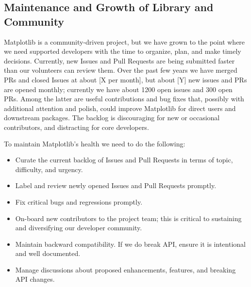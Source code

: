 \documentclass[11pt]{article}  %
\begin{document}
\subsection{Maintenance and Growth of Library and Community}


Matplotlib is a community-driven project, but we have grown to the point
where we need supported developers with the time to organize, plan, and
make timely decisions.  Currently, new Issues and Pull Requests are
being submitted faster than our volunteers can review them.  Over the
past few years we have merged PRs and closed Issues at about [X per
  month], but about [Y] new issues and PRs are opened monthly;
currently we have about 1200 open issues and 300 open PRs.  Among the
latter are useful contributions and bug fixes that, possibly with
additional attention and polish, could improve Matplotlib for direct
users and downstream packages.  The backlog is discouraging for new or
occasional contributors, and distracting for core developers.

To maintain Matplotlib's health we need to do the following:

\begin{itemize}[noitemsep]
\item Curate the current backlog of Issues and Pull Requests
  in terms of topic, difficulty, and urgency.
\item Label and review newly opened Issues and Pull Requests
  promptly.
\item Fix critical bugs and regressions promptly.
\item On-board new contributors to the project team; this is critical to
  sustaining and diversifying our developer community.
\item Maintain backward compatibility.  If we do break API, ensure it
  is intentional and well documented.
\item Manage discussions about proposed enhancements, features, and
  breaking API changes.
\end{itemize}
\end{document}
